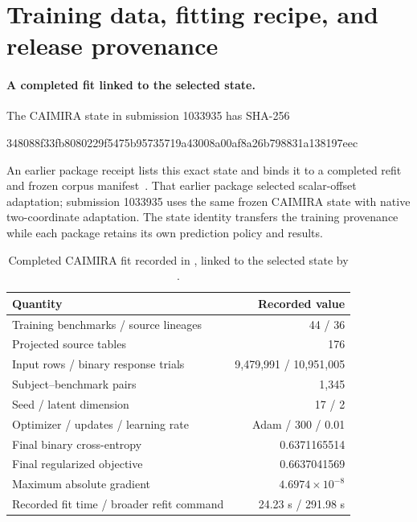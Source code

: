 \section{Training data, fitting recipe, and release provenance}
\label{app:training}
\paragraph{A completed fit linked to the selected state.}
The CAIMIRA state in submission 1033935 has SHA-256
\begin{center}\small\ttfamily
348088f33fb8080229f5475b95735719a43008a00af8a26b798831a138197eec
\end{center}
An earlier package receipt lists this exact state and binds it to a completed refit and frozen corpus manifest~\citep{release}. That earlier package selected scalar-offset adaptation; submission 1033935 uses the same frozen CAIMIRA state with native two-coordinate adaptation. The state identity transfers the training provenance while each package retains its own prediction policy and results.

\begin{table}[H]
\centering
\caption{Completed CAIMIRA fit recorded in , linked to the selected state by .}
\small
\begin{tabular}{@{}lr@{}}
\toprule
Quantity & Recorded value \\
\midrule
Training benchmarks / source lineages & 44 / 36 \\
Projected source tables & 176 \\
Input rows / binary response trials & 9,479,991 / 10,951,005 \\
Subject--benchmark pairs & 1,345 \\
Seed / latent dimension & 17 / 2 \\
Optimizer / updates / learning rate & Adam / 300 / 0.01 \\
Final binary cross-entropy & 0.6371165514 \\
Final regularized objective & 0.6637041569 \\
Maximum absolute gradient & $4.6974\times10^{-8}$ \\
Recorded fit time / broader refit command & 24.23 s / 291.98 s \\
\bottomrule
\end{tabular}
\end{table}

